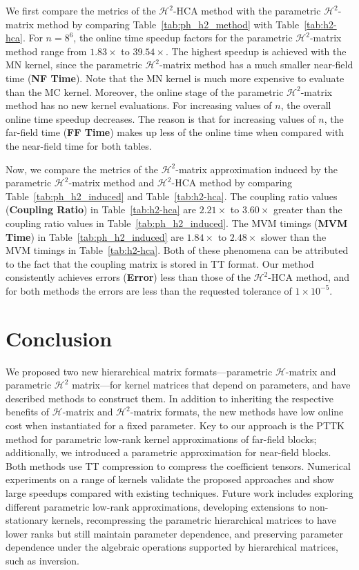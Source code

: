 \documentclass[final,3p,times]{elsarticle}
\newcommand{\mc}[1]{\mathcal{#1}}
\begin{document}
We first compare the metrics of the $\mc{H}^{2}$-HCA method with the parametric $\mc{H}^{2}$-matrix method by comparing Table~\ref{tab:ph_h2_method} with Table~\ref{tab:h2-hca}. For $n = 8^6$,  the online time speedup factors for the parametric $\mc{H}^2$-matrix method range from $1.83\times$ to $39.54 \times$. The highest speedup is achieved with the MN kernel, since the  parametric $\mc{H}^{2}$-matrix method has a much smaller near-field time (\textbf{NF Time}). Note that the MN kernel is much more expensive to evaluate than the MC kernel. Moreover,  the online stage of the parametric $\mc{H}^2$-matrix method has no new kernel evaluations. For increasing values of $n$, the overall online time speedup decreases. The reason  is that for increasing values of $n$, the far-field time (\textbf{FF Time}) makes up less of the online time when compared with the near-field time for both tables. 


Now, we compare the metrics of the $\mc{H}^{2}$-matrix approximation induced by the parametric $\mc{H}^{2}$-matrix method and $\mc{H}^{2}$-HCA method by comparing Table~\ref{tab:ph_h2_induced} and Table~\ref{tab:h2-hca}. The coupling ratio values (\textbf{Coupling Ratio}) in Table~\ref{tab:h2-hca} are $2.21\times$ to $3.60\times$ greater than the coupling ratio values in Table~\ref{tab:ph_h2_induced}. The MVM timings (\textbf{MVM Time}) in Table~\ref{tab:ph_h2_induced} are $1.84\times$ to $2.48 \times$ slower than the MVM timings in Table~\ref{tab:h2-hca}. Both of these phenomena can be attributed to the fact that the coupling matrix is stored in TT format. Our method consistently achieves errors (\textbf{Error}) less than those of the $\mc{H}^{2}$-HCA method, and for both methods the errors are less than the requested tolerance of $1 \times 10^{-5}$.


\section{Conclusion}
We proposed two new hierarchical matrix formats---parametric $\mc{H}$-matrix and parametric $\mc{H}^2$ matrix---for kernel matrices that depend on parameters, and have described methods to construct them. In addition to inheriting the respective benefits of $\mc{H}$-matrix and $\mc{H}^2$-matrix formats, the new methods have low online cost when instantiated for a fixed parameter. Key to our approach is the PTTK method for parametric low-rank kernel approximations of far-field blocks; additionally, we introduced a parametric approximation for near-field blocks. Both methods use TT compression to compress the coefficient tensors. Numerical experiments on a range of kernels validate the proposed approaches and show large speedups compared with existing techniques. 
Future work includes exploring different parametric low-rank approximations, developing extensions to non-stationary kernels, recompressing the parametric hierarchical matrices to have lower ranks but still maintain parameter dependence, and preserving parameter dependence under the algebraic operations supported by hierarchical matrices, such as inversion.
\end{document}
